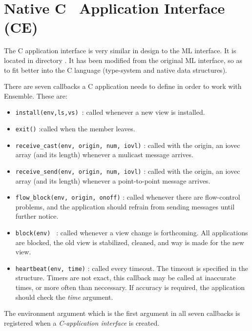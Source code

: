 \section{Native C \ensemble\ Application Interface (CE)}

The C application interface is very similar in design to the ML
interface. It is located in directory . It has been
modified from the original ML interface, so as to fit better into
the C language (type-system and native data structures).

There are seven callbacks a C application needs to define in order
to work with Ensemble. These are:

\begin{itemize}
\item 
{\tt install(env,ls,vs) }: called whenever a new view is installed.

\item 
{\tt exit()} :called when the member leaves. 

\item 
{\tt receive\_cast(env, origin, num, iovl)} :
called with the origin, an iovec array (and its length)
whenever a mulicast message arrives. 

\item
{\tt receive\_send(env, origin, num, iovl)} : 
called with the origin, an iovec array (and its length)
whenever a point-to-point message arrives. 

\item
{\tt flow\_block(env, origin, onoff)} : 
called whenever there are flow-control problems, and
the application should refrain from sending messages until further
notice.

\item
{\tt block(env) } : 
called whenever a view change is forthcoming. All
applications are blocked,  the old view is stabilized,
cleaned, and way is made for the new view. 

\item 
{\tt heartbeat(env, time)} : 
called every timeout. The timeout is specified in the 
structure. Timers are not exact, this callback may be called at
inaccurate times, or more often than neccessary. If accuracy is
required, the application should check the {\it time} argument. 
\end{itemize}

The environment argument which is the first argument in all seven
callbacks is registered when a {\it C-application interface} is created.

